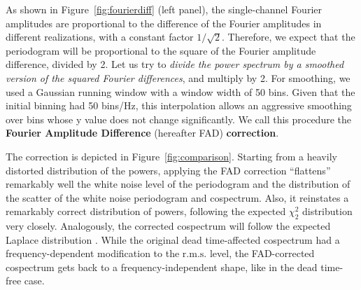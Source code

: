 \documentclass[twocolumn]{aastex61}
\newcommand{\rms}{\ensuremath{\mathrm{r.m.s.}}\xspace}
\begin{document}
As shown in Figure~\ref{fig:fourierdiff} (left panel), the single-channel Fourier amplitudes are proportional to the difference of the Fourier amplitudes in different realizations, with a constant factor $1/\sqrt{2}$.
Therefore, we expect that the periodogram will be proportional to the square of the Fourier amplitude difference, divided by 2.
Let us try to \textit{divide the power spectrum by a smoothed version of the squared Fourier differences}, and multiply by 2.
For smoothing, we used a Gaussian running window with a window width of 50 bins.
Given that the initial binning had 50 bins/Hz, this interpolation allows an aggressive smoothing over bins whose y value does not change significantly.
We call this procedure the \textbf{Fourier Amplitude Difference} (hereafter FAD) \textbf{correction}.

The correction is depicted in Figure~\ref{fig:comparison}. 
Starting from a heavily distorted distribution of the powers, applying the FAD correction ``flattens'' remarkably well the white noise level of the periodogram and the distribution of the scatter of the white noise periodogram and cospectrum. 
Also, it reinstates a remarkably correct distribution of powers, following the expected $\chi^2_2$ distribution \citep{Lewin+88} very closely. 
Analogously, the corrected cospectrum will follow the expected Laplace distribution \citep{Huppenkothen & Bachetti, sub.}.
While the original dead time-affected cospectrum had a frequency-dependent modification to the \rms level, the FAD-corrected cospectrum gets back to a frequency-independent shape, like in the dead time-free case.

\end{document}
